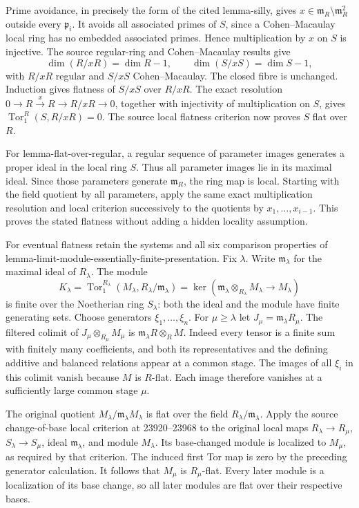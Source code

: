 Prime avoidance, in precisely the form of the cited lemma-silly, gives \(x\in\mathfrak m_R\setminus\mathfrak m_R^2\) outside every \(\mathfrak p_i\). It avoids all associated primes of \(S\), since a Cohen--Macaulay local ring has no embedded associated primes. Hence multiplication by \(x\) on \(S\) is injective. The source regular-ring and Cohen--Macaulay results give \[
\dim(R/xR)=\dim R-1,\qquad
\dim(S/xS)=\dim S-1,
\] with \(R/xR\) regular and \(S/xS\) Cohen--Macaulay. The closed fibre is unchanged. Induction gives flatness of \(S/xS\) over \(R/xR\). The exact resolution \(0\to R\xrightarrow{x}R\to R/xR\to0\), together with injectivity of multiplication on \(S\), gives \(\operatorname{Tor}_1^R(S,R/xR)=0\). The source local flatness criterion now proves \(S\) flat over \(R\).

For lemma-flat-over-regular, a regular sequence of parameter images generates a proper ideal in the local ring \(S\). Thus all parameter images lie in its maximal ideal. Since those parameters generate \(\mathfrak m_R\), the ring map is local. Starting with the field quotient by all parameters, apply the same exact multiplication resolution and local criterion successively to the quotients by \(x_1,\ldots,x_{i-1}\). This proves the stated flatness without adding a hidden locality assumption.

For eventual flatness retain the systems and all six comparison properties of lemma-limit-module-essentially-finite-presentation. Fix \(\lambda\). Write \(\mathfrak m_\lambda\) for the maximal ideal of \(R_\lambda\). The module \[
K_\lambda=\operatorname{Tor}_1^{R_\lambda}
 (M_\lambda,R_\lambda/\mathfrak m_\lambda)
 =\ker(\mathfrak m_\lambda\otimes_{R_\lambda}M_\lambda\longrightarrow M_\lambda)
\] is finite over the Noetherian ring \(S_\lambda\): both the ideal and the module have finite generating sets. Choose generators \(\xi_1,\ldots,\xi_n\). For \(\mu\geq\lambda\) let \(J_\mu=\mathfrak m_\lambda R_\mu\). The filtered colimit of \(J_\mu\otimes_{R_\mu}M_\mu\) is \(\mathfrak m_\lambda R\otimes_R M\). Indeed every tensor is a finite sum with finitely many coefficients, and both its representatives and the defining additive and balanced relations appear at a common stage. The images of all \(\xi_i\) in this colimit vanish because \(M\) is \(R\)-flat. Each image therefore vanishes at a sufficiently large common stage \(\mu\).

The original quotient \(M_\lambda/\mathfrak m_\lambda M_\lambda\) is flat over the field \(R_\lambda/\mathfrak m_\lambda\). Apply the source change-of-base local criterion at 23920--23968 to the original local maps \(R_\lambda\to R_\mu\), \(S_\lambda\to S_\mu\), ideal \(\mathfrak m_\lambda\), and module \(M_\lambda\). Its base-changed module is localized to \(M_\mu\), as required by that criterion. The induced first Tor map is zero by the preceding generator calculation. It follows that \(M_\mu\) is \(R_\mu\)-flat. Every later module is a localization of its base change, so all later modules are flat over their respective bases.

